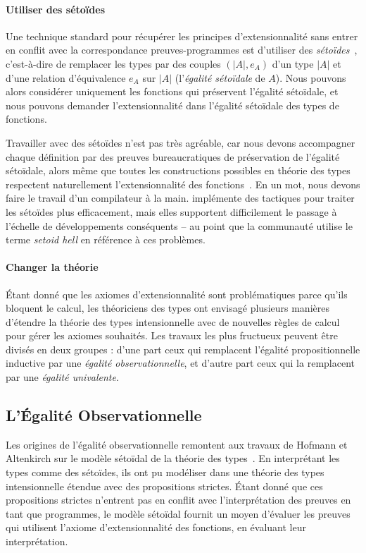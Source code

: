 \paragraph*{Utiliser des sétoïdes}
% 
Une technique standard pour récupérer les principes d'extensionnalité sans entrer
en conflit avec la correspondance preuves-programmes est d'utiliser des 
\emph{sétoïdes}~, c'est-à-dire de remplacer les types par 
des couples \( (|A|, e_A) \) d'un type \( |A| \) et d'une relation d'équivalence 
\( e_A \) sur \( |A| \) (l'\emph{égalité sétoïdale} de \( A \)).
% 
Nous pouvons alors considérer uniquement les fonctions qui préservent l'égalité 
sétoïdale, et nous pouvons demander l'extensionnalité dans l'égalité sétoïdale 
des types de fonctions.

Travailler avec des sétoïdes n'est pas très agréable, car nous devons accompagner 
chaque définition par des preuves bureaucratiques de préservation de l'égalité
sétoïdale, alors même que toutes les constructions possibles en théorie des types 
respectent naturellement l'extensionnalité des fonctions~. 
% 
En un mot, nous devons faire le travail d'un compilateur à la main. 
% 
\Coq implémente des tactiques pour traiter les sétoïdes plus efficacement, mais 
elles supportent difficilement le passage à l'échelle de développements conséquents -- 
au point que la communauté utilise le terme \emph{setoid hell} en référence à ces 
problèmes.

\paragraph*{Changer la théorie}
% 
Étant donné que les axiomes d'extensionnalité sont problématiques parce qu'ils 
bloquent le calcul, les théoriciens des types ont envisagé plusieurs manières 
d'étendre la théorie des types intensionnelle avec de nouvelles règles de calcul 
pour gérer les axiomes souhaités. 
% 
Les travaux les plus fructueux peuvent être divisés en deux groupes : d'une part ceux qui 
remplacent l'égalité propositionnelle inductive par une 
\emph{égalité observationnelle}, et d'autre part ceux qui la remplacent par une 
\emph{égalité univalente}.

\subsection{L'Égalité Observationnelle}

Les origines de l'égalité observationnelle remontent aux travaux de Hofmann et 
Altenkirch sur le modèle sétoïdal de la théorie des types~\cite{hofmann95,altenkirch99}.
% 
En interprétant les types comme des sétoïdes, ils ont pu modéliser
dans une théorie des types intensionnelle étendue avec des propositions strictes. 
Étant donné que ces propositions strictes n'entrent pas en conflit avec l'interprétation 
des preuves en tant que programmes, le modèle sétoïdal fournit un moyen d'évaluer les 
preuves qui utilisent l'axiome d'extensionnalité des fonctions, en évaluant leur 
interprétation.


